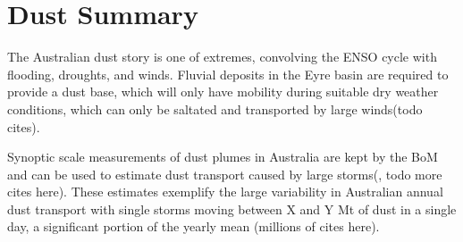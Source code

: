\section{Dust Summary}

The Australian dust story is one of extremes, convolving the ENSO cycle with flooding, droughts, and winds. Fluvial deposits in the Eyre basin are required to provide a dust base, which will only have mobility during suitable dry weather conditions, which can only be saltated and transported by large winds(todo cites).

Synoptic scale measurements of dust plumes in Australia are kept by the BoM and can be used to estimate dust transport caused by large storms(\cite{Leys_2011}, todo more cites here). These estimates exemplify the large variability in Australian annual dust transport with single storms moving between X and Y Mt of dust in a single day, a significant portion of the yearly mean (millions of cites here).